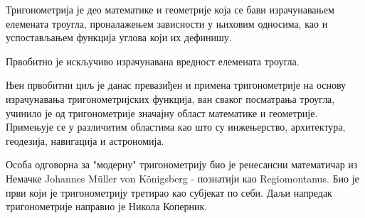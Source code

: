\documentclass[../diplomski.tex]{subfiles}
\begin{document}
Тригонометрија је део математике и геометрије која се бави израчунавањем
елемената троугла, проналажењем зависности у њиховим односима, као и
успостављањем функција углова који их дефинишу.

Првобитно је искључиво израчунавана вредност елемената троугла.

Њен првобитни циљ је данас превазиђен и примена тригонометрије на основу
израчунавања тригонометријских функција, ван сваког посматрања троугла,
учинило је од тригонометрије значајну област математике и геометрије.
Примењује се у различитим областима као што су инжењерство, архитектура,
геодезија, навигација и астрономија.

Особа одговорна за "модерну" тригонометрију био је ренесансни
математичар из Немачке Johannes Müller von Königsberg - познатији као
Regiomontanus. Био је први који је тригонометрију третирао као субјекат
по себи. Даљи напредак тригонометрије направио је Никола Коперник.
\end{document}
